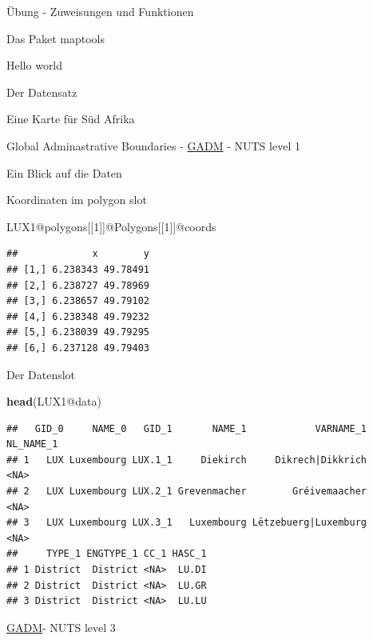 \documentclass[ignorenonframetext,]{beamer}
\newenvironment{Shaded}{\begin{snugshade}}{\end{snugshade}}
\newcommand{\DecValTok}[1]{\textcolor[rgb]{0.27,0.67,0.26}{#1}}
\newcommand{\KeywordTok}[1]{\textcolor[rgb]{0.26,0.66,0.93}{\textbf{#1}}}
\newcommand{\NormalTok}[1]{\textcolor[rgb]{0.74,0.68,0.62}{#1}}
\newcommand{\OperatorTok}[1]{\textcolor[rgb]{0.74,0.68,0.62}{#1}}
\begin{document}
\begin{frame}[fragile]{Übung - Zuweisungen und Funktionen}
\begin{frame}[fragile]{Das Paket maptools}
\begin{frame}[fragile]{Hello world}
\begin{frame}[fragile]{Der Datensatz}
\begin{frame}[fragile]{Eine Karte für Süd Afrika}
\begin{frame}[fragile]{Global Adminastrative Boundaries -
\href{http://www.gadm.org/}{GADM} - NUTS level 1}
\end{frame}

\begin{frame}[fragile]{Ein Blick auf die Daten}
\protect\hypertarget{ein-blick-auf-die-daten}{}

Koordinaten im polygon slot

\begin{Shaded}
\begin{Highlighting}[]
\NormalTok{LUX1}\OperatorTok{@}\NormalTok{polygons[[}\DecValTok{1}\NormalTok{]]}\OperatorTok{@}\NormalTok{Polygons[[}\DecValTok{1}\NormalTok{]]}\OperatorTok{@}\NormalTok{coords}
\end{Highlighting}
\end{Shaded}

\begin{verbatim}
##             x        y
## [1,] 6.238343 49.78491
## [2,] 6.238727 49.78969
## [3,] 6.238657 49.79102
## [4,] 6.238348 49.79232
## [5,] 6.238039 49.79295
## [6,] 6.237128 49.79403
\end{verbatim}

\end{frame}

\begin{frame}[fragile]{Der Datenslot}
\protect\hypertarget{der-datenslot-1}{}

\begin{Shaded}
\begin{Highlighting}[]
\KeywordTok{head}\NormalTok{(LUX1}\OperatorTok{@}\NormalTok{data)}
\end{Highlighting}
\end{Shaded}

\begin{verbatim}
##   GID_0     NAME_0   GID_1       NAME_1            VARNAME_1 NL_NAME_1
## 1   LUX Luxembourg LUX.1_1     Diekirch     Dikrech|Dikkrich      <NA>
## 2   LUX Luxembourg LUX.2_1 Grevenmacher        Gréivemaacher      <NA>
## 3   LUX Luxembourg LUX.3_1   Luxembourg Lëtzebuerg|Luxemburg      <NA>
##     TYPE_1 ENGTYPE_1 CC_1 HASC_1
## 1 District  District <NA>  LU.DI
## 2 District  District <NA>  LU.GR
## 3 District  District <NA>  LU.LU
\end{verbatim}

\end{frame}

\begin{frame}[fragile]{\href{http://www.gadm.org/}{GADM}- NUTS level 3}
\protect\hypertarget{gadm--nuts-level-3}{}


\end{frame}
\end{frame}
\end{frame}
\end{frame}
\end{frame}
\end{frame}
\end{document}
